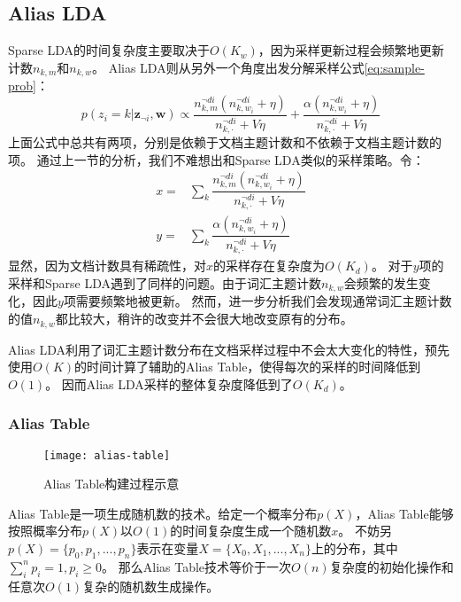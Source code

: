 \subsection{Alias LDA}
Sparse LDA的时间复杂度主要取决于$O(K_w)$，因为采样更新过程会频繁地更新计数$n_{k, m}$和$n_{k, w}$。
Alias LDA则从另外一个角度出发分解采样公式\ref{eq:sample-prob}：
\begin{equation}
\label{eq:sparse-sample-prob}
p( z_i = k | \mathbf{z}_{\neg i},  \mathbf{w}) 
	\propto   \dfrac{  n_{k, m}^{\neg di}(n_{k, w_i}^{\neg di} + \eta) }{ n_{k, \cdot}^{\neg di} + V\eta} +
\dfrac{\alpha( n_{k, w_i}^{\neg di} + \eta) }{ n_{k, \cdot}^{\neg di} + V\eta} 
\end{equation}
上面公式中总共有两项，分别是依赖于文档主题计数和不依赖于文档主题计数的项。
通过上一节的分析，我们不难想出和Sparse LDA类似的采样策略。令：
\begin{align}
x = & \sum_k {\dfrac{n_{k, m}^{\neg di}(n_{k, w_i}^{\neg di} + \eta) }{ n_{k,\cdot}^{\neg di} + V\eta}}\\
y = & \sum_k {\dfrac{\alpha( n_{k, w_i}^{\neg di} + \eta) }{ n_{k, \cdot}^{\neg di} + V\eta} }
\end{align}
显然，因为文档计数具有稀疏性，对$x$的采样存在复杂度为$O(K_d)$。
对于$y$项的采样和Sparse LDA遇到了同样的问题。由于词汇主题计数$n_{k, w}$会频繁的发生变化，因此$y$项需要频繁地被更新。
然而，进一步分析我们会发现通常词汇主题计数的值$n_{k, w}$都比较大，稍许的改变并不会很大地改变原有的分布。

Alias LDA利用了词汇主题计数分布在文档采样过程中不会太大变化的特性，预先使用$O(K)$的时间计算了辅助的Alias Table，使得每次的采样的时间降低到$O(1)$。
因而Alias LDA采样的整体复杂度降低到了$O(K_d)$。

\subsubsection{Alias Table}
\begin{figure}[htb]\centering
\texttt{[image: alias-table]}
\caption{Alias Table构建过程示意}
\label{fig:alias-table}       %
\end{figure}
Alias Table\cite{vose1991a}是一项生成随机数的技术。给定一个概率分布$p(X)$，Alias Table能够按照概率分布$p(X)$以$O(1)$的时间复杂度生成一个随机数$x$。
不妨另$p(X) = \{p_0, p_1, ..., p_n\}$表示在变量$X=\{X_0, X_1, ..., X_n\}$上的分布，其中$\sum_i^n {p_i} = 1, p_i \ge 0$。
那么Alias Table技术等价于一次$O(n)$复杂度的初始化操作和任意次$O(1)$复杂的随机数生成操作。

